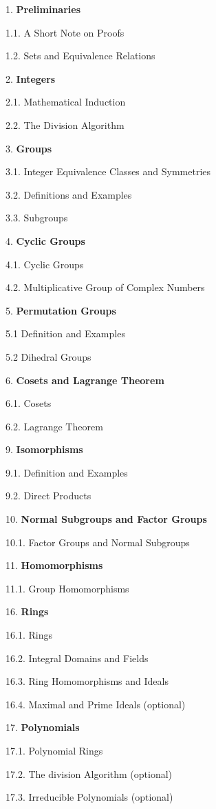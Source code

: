\documentclass{osucourse}
\begin{document}
\begin{TopicsOutline}
1. \textbf{Preliminaries}

1.1. A Short Note on Proofs

1.2. Sets and Equivalence Relations

2. \textbf{Integers}

2.1. Mathematical Induction

2.2. The Division Algorithm

3. \textbf{Groups}

3.1. Integer Equivalence Classes and Symmetries

3.2. Definitions and Examples

3.3. Subgroups

4. \textbf{Cyclic Groups}

4.1. Cyclic Groups

4.2. Multiplicative Group of Complex Numbers

5. \textbf{Permutation Groups}

5.1 Definition and Examples

5.2 Dihedral Groups

6. \textbf{Cosets and Lagrange Theorem}

6.1. Cosets

6.2. Lagrange Theorem

9. \textbf{Isomorphisms}

9.1. Definition and Examples

9.2. Direct Products

10. \textbf{Normal Subgroups and Factor Groups}

10.1. Factor Groups and Normal Subgroups

11. \textbf{Homomorphisms}

11.1. Group Homomorphisms

16. \textbf{Rings}

16.1. Rings

16.2. Integral Domains and Fields

16.3. Ring Homomorphisms and Ideals

16.4. Maximal and Prime Ideals (optional)

17. \textbf{Polynomials}

17.1. Polynomial Rings

17.2. The division Algorithm (optional)

17.3. Irreducible Polynomials (optional)
\end{TopicsOutline}
\end{document}
